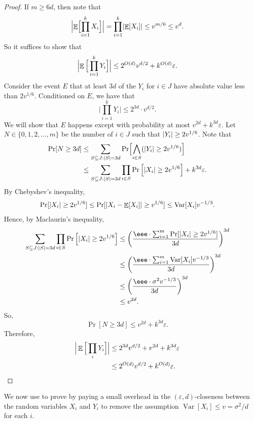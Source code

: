\documentclass{toc}
\def\eps{\varepsilon}
\DeclarePairedDelimiter{\abs}{\lvert}{\rvert}
\DeclareMathOperator*{\E}{\mathbb{E}}                 %
\DeclareMathOperator*{\Var}{Var}                 %
\begin{document}
\begin{proof}
    If $m \ge 6d$, then note that
    \[
      \Bigl| \E \Bigl[ \prod_{i=1}^k X_i \Bigr] \Bigr|
      = \prod_{i=1}^k \abs{ \E[X_i] }
      \le v^{m/6}
      \le v^{d}.
    \]
    So it suffices to show that
    \[
      \Bigl| \E \Big[ \prod_{i=1}^k Y_i \Big] \Bigr| 
      \le 2^{O(d)} v^{d/2} + k^{O(d)} \eps.
    \]
    Consider the event $E$ that at least $3d$ of the $Y_i$ for $i \in J$ have absolute value less than $2 v^{1/6}$.
    Conditioned on $E$, we have that
    \[
      \Big| \prod_{i=1}^k Y_i \Big| \le  2^{3d} \cdot v^{d/2} .
    \]
    We will show that $E$ happens except with probability at most $v^{2d} + k^{3d} \eps$.
    Let $N \in \{0, 1, 2, \ldots, m\}$ be the number of $i \in J$ such that $\abs{Y_i} \ge 2 v^{1/6}$.
    Note that
    \begin{align*}
      \Pr[ N \ge 3d ]
      &\le \sum_{S \subseteq J: \abs{S} = 3d} \Pr\Bigl[ \bigwedge_{i \in S} ( \abs{Y_i} \ge 2 v^{1/6} ) \Bigr] \\
      &\le \sum_{S \subseteq J: \abs{S} = 3d} \prod_{i \in S} \Pr\left[ \abs{X_i} \ge 2 v^{1/6} \right] + k^{3d} \eps .
    \end{align*}
    By Chebyshev's inequality,
    \[
      \Pr[ \abs{X_i} \ge 2 v^{1/6} ]
      \le \Pr[ \abs{X_i - \E[X_i]} \ge v^{1/6} ]
      \le \Var[X_i] v^{-1/3} .
    \]
    Hence, by Maclaurin's inequality,
    \begin{align*}
      \sum_{S \subseteq J: \abs{S} = 3d} \prod_{i \in S} \Pr\left[ \abs{X_i} \ge 2 v^{1/6} \right]
      &\le \left( \frac{\eee\cdot \sum_{i=1}^m \Pr[ \abs{X_i} \ge 2 v^{1/6} ] }{ 3d } \right)^{3d} \\
      &\le \left( \frac{\eee\cdot \sum_{i=1}^m \Var[X_i] v^{-1/3} }{ 3d } \right)^{3d} \\
      &\le \left( \frac{\eee\cdot \sigma^2 v^{-1/3} }{ 3d } \right)^{3d} \\
      &\le v^{2d} .
    \end{align*}
    So,
    \[
      \Pr[ N \ge 3d] \le v^{2d} + k^{3d} \eps .
    \]
    Therefore,
    \begin{align*}
      \Big| \E \Big[\prod_i Y_i \Big] \Big|
      &\le 2^{3d} v^{d/2} + v^{2d} + k^{3d} \eps \\
      &\le 2^{O(d)} v^{d/2} + k^{O(d)} \eps . \qedhere
    \end{align*}
  \end{proof}

  We now use  to prove  by paying a small overhead in the $(\eps, d)$-closeness between the random variables $X_i$ and $Y_i$ to remove the assumption $\Var[X_i] \le v = \sigma^2/d$ for each $i$.
\end{document}
